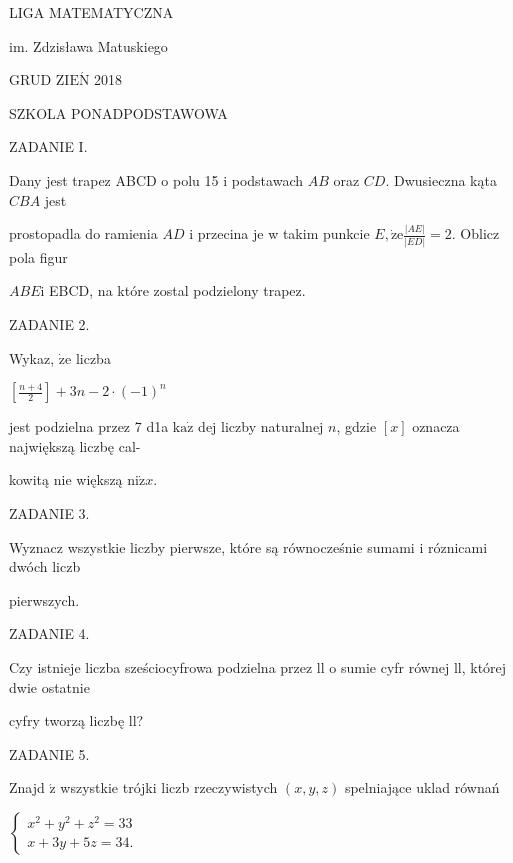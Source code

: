 \documentclass[a4paper,12pt]{article}
\begin{document}
LIGA MATEMATYCZNA

im. Zdzisława Matuskiego

GRUD Z$\mathrm{I}\mathrm{E}\acute{\mathrm{N}}$ 2018

SZKOLA PONADPODSTAWOWA

ZADANIE I.

Dany jest trapez ABCD o polu 15 i podstawach $AB$ oraz $CD$. Dwusieczna kąta $CBA$ jest

prostopadla do ramienia $AD$ i przecina je w takim punkcie $E, \dot{\mathrm{z}}\mathrm{e} \displaystyle \frac{|AE|}{|ED|}=2$. Oblicz pola figur

$ABE\mathrm{i}$ EBCD, na które zostal podzielony trapez.

ZADANIE 2.

Wykaz, $\dot{\mathrm{z}}\mathrm{e}$ liczba

$[\displaystyle \frac{n+4}{2}]+3n-2\cdot(-1)^{n}$

jest podzielna przez 7 d1a $\mathrm{k}\mathrm{a}\dot{\mathrm{z}}$ dej liczby naturalnej $n$, gdzie $[x]$ oznacza największą liczbę cal-

kowitą nie większą $\mathrm{n}\mathrm{i}\dot{\mathrm{z}}x.$

ZADANIE 3.

Wyznacz wszystkie liczby pierwsze, które są równocześnie sumami i róznicami dwóch liczb

pierwszych.

ZADANIE 4.

Czy istnieje liczba sześciocyfrowa podzielna przez ll o sumie cyfr równej ll, której dwie ostatnie

cyfry tworzą liczbę ll?

ZADANIE 5.

Znajd $\acute{\mathrm{z}}$ wszystkie trójki liczb rzeczywistych $(x,y,z)$ spelniające uklad równań

$\left\{\begin{array}{l}
x^{2}+y^{2}+z^{2}=33\\
x+3y+5z=34.
\end{array}\right.$
\end{document}
